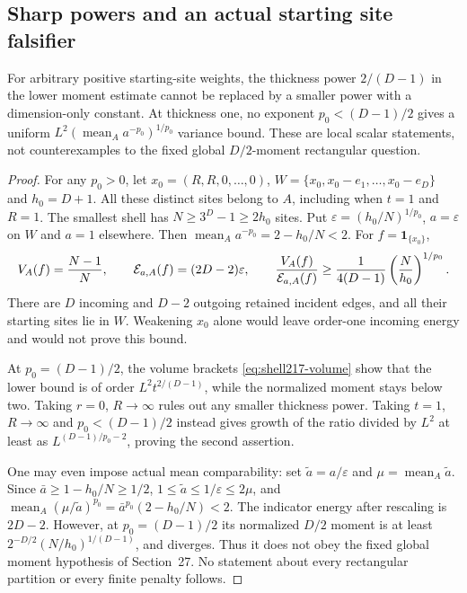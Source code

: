 \subsection{Sharp powers and an actual starting site falsifier}
\begin{proposition}\label{prop:shell217-sharp}
For arbitrary positive starting-site weights, the thickness power
$2/(D-1)$ in the lower moment estimate cannot be replaced by a smaller
power with a dimension-only constant. At thickness one, no exponent
$p_0<(D-1)/2$ gives a uniform $L^2(\operatorname{mean}_A a^{-p_0})^{1/p_0}$
variance bound. These are local scalar statements, not counterexamples to
the fixed global $D/2$-moment rectangular question.
\end{proposition}
\begin{proof}
For any $p_0>0$, let $x_0=(R,R,0,\ldots,0)$,
$W=\{x_0,x_0-e_1,\ldots,x_0-e_D\}$ and $h_0=D+1$.
All these distinct sites belong to $A$, including when $t=1$ and $R=1$.
The smallest shell has $N\geq3^D-1\geq2h_0$ sites. Put
$\varepsilon=(h_0/N)^{1/p_0}$, $a=\varepsilon$ on $W$ and $a=1$ elsewhere.
Then $\operatorname{mean}_A a^{-p_0}=2-h_0/N<2$.
For $f=\boldsymbol1_{\{x_0\}}$,
\[
 V_A(f)=\frac{N-1}N,\qquad
 \mathcal E_{a,A}(f)=(2D-2)\varepsilon,\qquad
 \frac{V_A(f)}{\mathcal E_{a,A}(f)}
 \geq\frac1{4(D-1)}\left(\frac N{h_0}\right)^{1/p_0}.
\]
There are $D$ incoming and $D-2$ outgoing retained incident edges, and
all their starting sites lie in $W$. Weakening $x_0$ alone would leave
order-one incoming energy and would not prove this bound.

At $p_0=(D-1)/2$, the volume brackets \eqref{eq:shell217-volume} show
that the lower bound is of order $L^2t^{2/(D-1)}$, while the normalized
moment stays below two. Taking $r=0$, $R\to\infty$ rules out any smaller
thickness power. Taking $t=1$, $R\to\infty$ and $p_0<(D-1)/2$ instead
gives growth of the ratio divided by $L^2$ at least as
$L^{(D-1)/p_0-2}$, proving the second assertion.

One may even impose actual mean comparability: set
$\widetilde a=a/\varepsilon$ and $\mu=\operatorname{mean}_A\widetilde a$.
Since $\bar a\geq1-h_0/N\geq1/2$,
$1\leq\widetilde a\leq1/\varepsilon\leq2\mu$, and
$\operatorname{mean}_A(\mu/\widetilde a)^{p_0}
=\bar a^{p_0}(2-h_0/N)<2$.
The indicator energy after rescaling is $2D-2$. However, at
$p_0=(D-1)/2$ its normalized $D/2$ moment is at least
$2^{-D/2}(N/h_0)^{1/(D-1)}$, and diverges. Thus it does not obey the
fixed global moment hypothesis of Section~27. No statement about every
rectangular partition or every finite penalty follows.
\end{proof}

